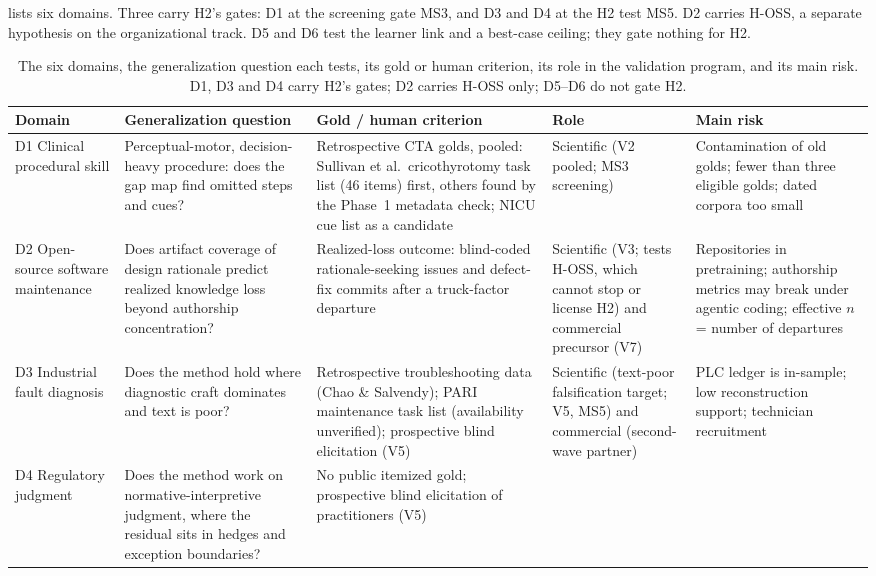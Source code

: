 lists six domains. Three carry H2's gates: D1 at the screening gate MS3, and
D3 and D4 at the H2 test MS5. D2 carries H-OSS, a separate hypothesis on the organizational
track. D5 and D6 test the learner link and a best-case ceiling; they gate nothing for H2.

\begin{table}[tbp]
  \centering
  \small
  \caption{The six domains, the generalization question each tests, its gold or human
  criterion, its role in the validation program, and its main risk. D1, D3 and D4 carry H2's
  gates; D2 carries H-OSS only; D5--D6 do not gate H2.}
  \label{tab:domains}
  \begin{tabularx}{\linewidth}{@{}p{1.7cm}XXp{2.0cm}X@{}}
    \toprule
    Domain & Generalization question & Gold / human criterion & Role & Main risk \\
    \midrule
    D1 Clinical procedural skill &
      Perceptual-motor, decision-heavy procedure: does the gap map find omitted steps and cues? &
      Retrospective CTA golds, pooled: Sullivan et al.\ cricothyrotomy task list (46 items) first, others found by the Phase~1 metadata check; NICU cue list as a candidate &
      Scientific (V2 pooled; MS3 screening) &
      Contamination of old golds; fewer than three eligible golds; dated corpora too small \\
    D2 Open-source software maintenance &
      Does artifact coverage of design rationale predict realized knowledge loss beyond authorship concentration? &
      Realized-loss outcome: blind-coded rationale-seeking issues and defect-fix commits after a truck-factor departure &
      Scientific (V3; tests H-OSS, which cannot stop or license H2) and commercial precursor
      (V7) &
      Repositories in pretraining; authorship metrics may break under agentic coding; effective $n$ = number of departures \\
    D3 Industrial fault diagnosis &
      Does the method hold where diagnostic craft dominates and text is poor? &
      Retrospective troubleshooting data (Chao \& Salvendy); PARI maintenance task list (availability unverified); prospective blind elicitation (V5) &
      Scientific (text-poor falsification target; V5, MS5) and commercial (second-wave partner) &
      PLC ledger is in-sample; low reconstruction support; technician recruitment \\
    D4 Regulatory judgment &
      Does the method work on normative-interpretive judgment, where the residual sits in hedges and exception boundaries? &
      No public itemized gold; prospective blind elicitation of practitioners (V5) &

\end{tabularx}
\end{table}
